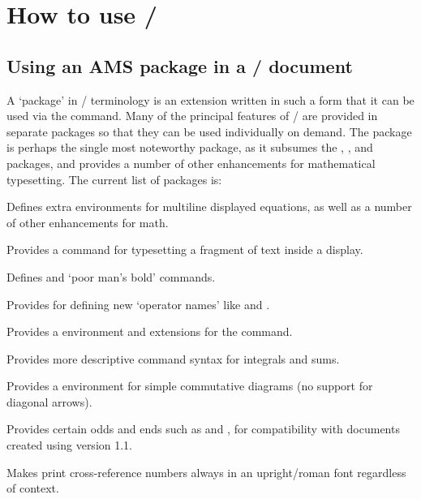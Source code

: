 \documentclass[leqno,titlepage,openany]{amsldoc}
\begin{document}
\chapter{How to use \amslatex/}

\section{Using an AMS package in a \latex/ document}\label{usepackage}

A `package'
in \latex/ terminology is an extension written in such a
form that it can be used via the  command. Many of the
principal features of \amslatex/ are provided in separate packages so
that they can be used individually on demand. The  package
is perhaps the single most noteworthy package, as it subsumes the
, , and  packages, and provides a
number of other enhancements for mathematical typesetting.
The current list of packages is:
\begin{description}
\raggedright
\item[\pkg{amsmath}] Defines extra environments for multiline displayed
  equations, as well as a number of other enhancements for math.

\item[\pkg{amstext}] Provides a  command for
  typesetting a fragment of text inside a display.

\item[\pkg{amsbsy}] Defines  and  `poor man's
  bold' commands.

\item[\pkg{amsopn}] Provides  for defining new
  `operator names' like  and .

\item[\pkg{amsthm}] Provides a  environment and
  extensions for the  command.

\item[\pkg{amsintx}] Provides more descriptive command syntax for
  integrals and sums.

\item[\pkg{amscd}] Provides a  environment for simple commutative
  diagrams (no support for diagonal arrows).

\item[\pkg{amsxtra}] Provides certain odds and ends such as 
  and , for compatibility with documents created using
  version 1.1.

\item[\pkg{upref}] Makes  print cross-reference numbers always
in an upright/roman font regardless of context.

\end{description}
\end{document}
